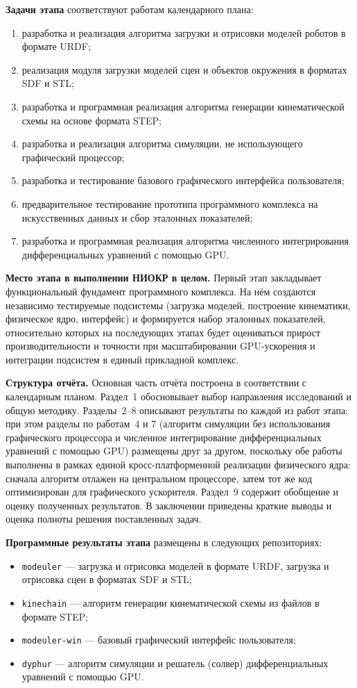 \textbf{Задачи этапа} соответствуют работам календарного плана:
\begin{enumerate}
  \item разработка и реализация алгоритма загрузки и отрисовки моделей роботов в
        формате URDF;
  \item реализация модуля загрузки моделей сцен и объектов окружения в форматах
        SDF и STL;
  \item разработка и программная реализация алгоритма генерации кинематической
        схемы на основе формата STEP;
  \item разработка и реализация алгоритма симуляции, не использующего
        графический процессор;
  \item разработка и тестирование базового графического интерфейса пользователя;
  \item предварительное тестирование прототипа программного комплекса на
        искусственных данных и сбор эталонных показателей;
  \item разработка и программная реализация алгоритма численного интегрирования
        дифференциальных уравнений с помощью GPU.
\end{enumerate}

\textbf{Место этапа в выполнении НИОКР в целом.}
Первый этап закладывает функциональный фундамент программного комплекса. На нём
создаются независимо тестируемые подсистемы (загрузка моделей, построение
кинематики, физическое ядро, интерфейс) и формируется набор эталонных
показателей, относительно которых на последующих этапах будет оцениваться
прирост производительности и точности при масштабировании GPU-ускорения и
интеграции подсистем в единый прикладной комплекс.

\textbf{Структура отчёта.}
Основная часть отчёта построена в соответствии с календарным планом. Раздел~1
обосновывает выбор направления исследований и общую методику. Разделы~2--8
описывают результаты по каждой из работ этапа; при этом разделы по работам~4 и
7 (алгоритм симуляции без использования графического процессора и численное
интегрирование дифференциальных уравнений с помощью GPU) размещены друг за
другом, поскольку обе работы выполнены в рамках единой кросс-платформенной
реализации физического ядра: сначала алгоритм отлажен на центральном
процессоре, затем тот же код оптимизирован для графического ускорителя.
Раздел~9 содержит обобщение и оценку полученных результатов. В заключении
приведены краткие выводы и оценка полноты решения поставленных задач.

\textbf{Программные результаты этапа} размещены в следующих репозиториях:
\begin{itemize}
  \item \texttt{modeuler} --- загрузка и отрисовка моделей в формате URDF,
        загрузка и отрисовка сцен в форматах SDF и STL;
  \item \texttt{kinechain} --- алгоритм генерации кинематической схемы из файлов
        в формате STEP;
  \item \texttt{modeuler-win} --- базовый графический интерфейс пользователя;
  \item \texttt{dyphur} --- алгоритм симуляции и решатель (солвер)
        дифференциальных уравнений с помощью GPU.
\end{itemize}
